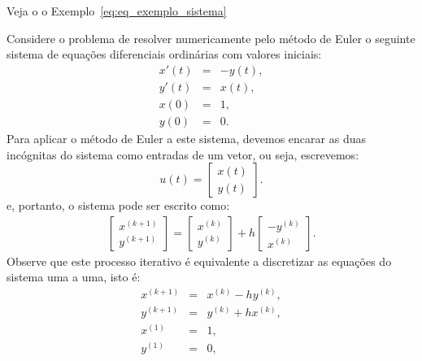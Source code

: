 Veja o  o Exemplo~\ref{eq:eq_exemplo_sistema}
\begin{ex}\label{ex:exemplo_sistema_PVI}Considere o problema de resolver numericamente pelo método de Euler o seguinte sistema de equações diferenciais ordinárias com valores iniciais:
\begin{subequations}\label{eq:eq_exemplo_sistema}
\begin{eqnarray}
x'(t)&=&-y(t),\\
y'(t)&=&x(t),\\
x(0)&=&1,\\
y(0)&=&0.
\end{eqnarray}
\end{subequations}
Para aplicar o método de Euler a este sistema, devemos encarar as duas incógnitas do sistema como entradas de um vetor, ou seja, escrevemos:
 \begin{equation} u(t)=\left[\begin{array}{c}x(t)\\y(t)\end{array}\right]. \end{equation}
 e, portanto, o sistema pode ser escrito como:
\begin{eqnarray}
\left[\begin{array}{c}x^{(k+1)}\\y^{(k+1)}\end{array}\right]=\left[\begin{array}{c}x^{(k)}\\y^{(k)}\end{array}\right]+h\left[\begin{array}{c}-y^{(k)}\\x^{(k)}\end{array}\right].
\end{eqnarray}
Observe que este processo iterativo é equivalente a discretizar as equações do sistema uma a uma, isto é:
\begin{eqnarray}
x^{(k+1)}&=&x^{(k)}-hy^{(k)},\\
y^{(k+1)}&=&y^{(k)}+hx^{(k)},\\
x^{(1)}&=&1,\\
y^{(1)}&=&0,\\
\end{eqnarray}
\end{ex}

